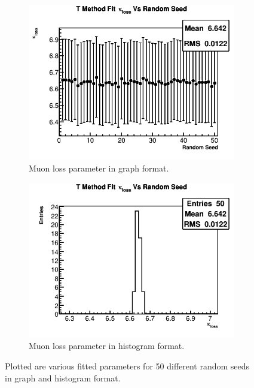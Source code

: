 \begin{figure}[]
\begin{subfigure}[t]{0.45\textwidth}
		    \centering
			\includegraphics[width=\textwidth]{TMethod_kappa_loss_Vs_Iter_Canv}
		    \caption{Muon loss parameter in graph format.}
	    \end{subfigure}
	    \hspace{4mm}
	    \begin{subfigure}[t]{0.45\textwidth}
		    \centering
			\includegraphics[width=\textwidth]{TMethod_kappa_loss_Vs_Iter_Canv_hist}
		    \caption{Muon loss parameter in histogram format.}
	    \end{subfigure}%
	\caption[TMethodRandomSeedsPars2]{Plotted are various fitted parameters for 50 different random seeds in graph and histogram format.}
	\label{fig:TMethodRandomSeedsPars2}
	\end{figure}

